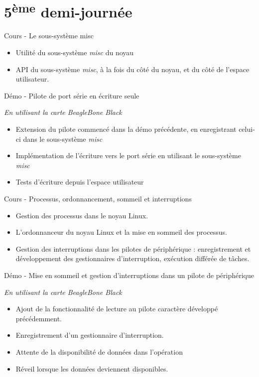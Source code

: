\documentclass[a4paper,12pt,obeyspaces,spaces,hyphens]{article}
\begin{document}
\section{5\textsuperscript{ème} demi-journée}

\feagendatwocolumn
{Cours - Le sous-système misc}
{
  \begin{itemize}
  \item Utilité du sous-système {\em misc} du noyau
  \item API du sous-système {\em misc}, à la fois du côté du noyau, et
    du côté de l'espace utilisateur.
  \end{itemize}
}
{Démo - Pilote de port série en écriture seule}
{
  {\em En utilisant la carte BeagleBone Black}
  \begin{itemize}
  \item Extension du pilote commencé dans la démo précédente, en
    enregistrant celui-ci dans le sous-système {\em misc}
  \item Implémentation de l'écriture vers le port série en
    utilisant le sous-système {\em misc}
  \item Tests d'écriture depuis l'espace utilisateur
  \end{itemize}
}

\feagendatwocolumn
{Cours - Processus, ordonnancement, sommeil et interruptions}
{
  \begin{itemize}
  \item Gestion des processus dans le noyau Linux.
  \item L'ordonnanceur du noyau Linux et la mise en sommeil des processus.
  \item Gestion des interruptions dans les pilotes de périphérique :
    enregistrement et développement des gestionnaires d'interruption,
    exécution différée de tâches.
  \end{itemize}
}
{Démo - Mise en sommeil et gestion d'interruptions dans un pilote de périphérique}
{
  {\em En utilisant la carte BeagleBone Black}
  \begin{itemize}
  \item Ajout de la fonctionnalité de lecture au pilote caractère développé
    précédemment.
  \item Enregistrement d'un gestionnaire d'interruption.
  \item Attente de la disponibilité de données dans l'opération 
  \item Réveil lorsque les données deviennent disponibles.
  \end{itemize}
}
\end{document}
